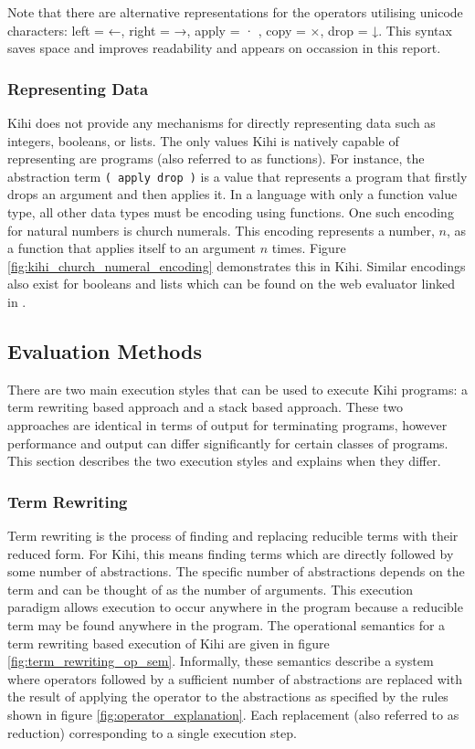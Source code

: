 


Note that there are alternative representations for the operators utilising unicode characters: left = ←, right = →, apply = · , copy = ×, drop = ↓. This syntax saves space and improves readability and appears on occassion in this report.


\subsubsection{Representing Data}
Kihi does not provide any mechanisms for directly representing data such as integers, booleans, or lists. The only values Kihi is natively capable of representing are programs (also referred to as functions). For instance, the abstraction term \lstinline{( apply drop )} is a value that represents a program that firstly drops an argument and then applies it. In a language with only a function value type, all other data types must be encoding using functions. One such encoding for natural numbers is church numerals. This encoding represents a number, $n$, as a function that applies itself to an argument $n$ times. Figure \ref{fig:kihi_church_numeral_encoding} demonstrates this in Kihi. Similar encodings also exist for booleans and lists which can be found on the web evaluator linked in \cite{jones2018practice}.

\subsection{Evaluation Methods}\label{sec:background_evaluation_methods}
There are two main execution styles that can be used to execute Kihi programs: a term rewriting based approach and a stack based approach. These two approaches are identical in terms of output for terminating programs, however performance and output can differ significantly for certain classes of programs. This section describes the two execution styles and explains when they differ.

\subsubsection*{Term Rewriting}
Term rewriting is the process of finding
and replacing reducible terms with their reduced form. For Kihi,
this means finding terms which are directly followed by
some number of abstractions. The specific number of abstractions depends on the term and can be thought of as the
number of arguments. This execution paradigm allows execution
to occur anywhere in the program because a reducible term may
be found anywhere in the program. The operational semantics for a term rewriting based execution of
Kihi are given in figure \ref{fig:term_rewriting_op_sem}. Informally, these semantics describe a system where operators followed by a sufficient number of abstractions are replaced with the result of applying the operator to the abstractions as specified by the rules shown in figure \ref{fig:operator_explanation}. Each replacement (also referred to as reduction) corresponding to a single execution step.

